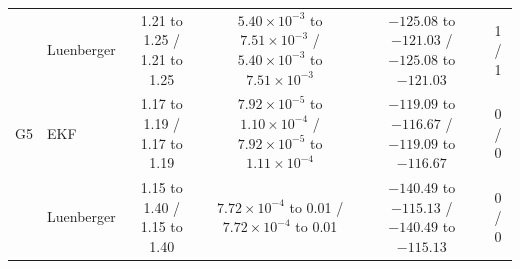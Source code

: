 \begin{table}[htbp]
{\begin{tabular}{llcccc}
 & Luenberger & 1.21 to 1.25 / 1.21 to 1.25 & $5.40{\times}10^{-3}$ to $7.51{\times}10^{-3}$ / $5.40{\times}10^{-3}$ to $7.51{\times}10^{-3}$ & $-125.08$ to $-121.03$ / $-125.08$ to $-121.03$ & 1 / 1 \\
\addlinespace
G5 & EKF & 1.17 to 1.19 / 1.17 to 1.19 & $7.92{\times}10^{-5}$ to $1.10{\times}10^{-4}$ / $7.92{\times}10^{-5}$ to $1.11{\times}10^{-4}$ & $-119.09$ to $-116.67$ / $-119.09$ to $-116.67$ & 0 / 0 \\
 & Luenberger & 1.15 to 1.40 / 1.15 to 1.40 & $7.72{\times}10^{-4}$ to 0.01 / $7.72{\times}10^{-4}$ to 0.01 & $-140.49$ to $-115.13$ / $-140.49$ to $-115.13$ & 0 / 0 \\
\bottomrule
\end{tabular}%
}
\end{table}
